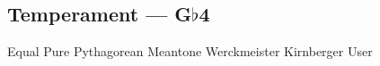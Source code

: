 \subsection[Temperament]{Temperament --- \UiKey{\I}\UiKey{\SET}G$\flat$4}










































Equal
Pure
Pythagorean
Meantone
Werckmeister
Kirnberger
User

